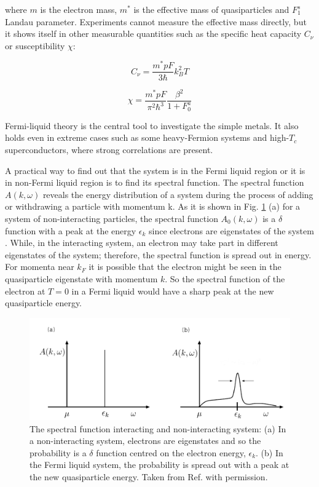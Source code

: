 \noindent where $m$ is the electron mass, $m^*$ is the effective mass of quasiparticles and $F_1 ^s$ Landau parameter. Experiments cannot measure the effective mass directly, but it shows itself in other measurable quantities such as the specific heat capacity $C_\nu$ or susceptibility $\chi$:

\begin{equation}
    C_\nu =\frac{m^* pF}{3\hbar} k_B ^2 T
\end{equation}


\begin{equation}
    \chi = \frac{m^*pF}{\pi ^2 \hbar^3} \frac{\beta ^2}{1+F_0 ^a}
\end{equation}

Fermi-liquid theory is the central tool to investigate the simple metals. It also holds even in extreme cases such as some heavy-Fermion systems and high-$T_{c}$ superconductors, where strong correlations are present.

A practical way to find out that the system is in the Fermi liquid region or it is in non-Fermi liquid region is to find its spectral function. The spectral function $A(k, \omega)$ reveals the energy distribution of a system during the process of adding or withdrawing a particle with momentum k. As it is shown in Fig. \ref{fig:flspectral} (a) for a system of non-interacting particles, the spectral function $A_0(k, \omega)$ is a $\delta$ function with a peak at the energy $\epsilon _k$ since electrons are eigenstates of the system \cite{Schofield, Saarloos}. While, in the interacting system, an electron may take part in different eigenstates of the system; therefore, the spectral function is spread out in energy. For momenta near $k_F$  it is possible that the electron might be seen in the quasiparticle eigenstate with momentum $k$. So the spectral function of the electron at $T = 0$  in a Fermi liquid would have a sharp peak at the new quasiparticle energy.

\begin{figure}[ht]
\centering
    \includegraphics[width=0.8\linewidth]{fig1/flspectral.pdf}
    
\caption{The spectral function interacting and non-interacting system: (a) In a non-interacting system, electrons are eigenstates and so the probability is a $\delta$ function centred on the electron energy,
$\epsilon _k$. (b) In the Fermi liquid system, the probability is spread out with a peak at the new quasiparticle energy. Taken from Ref. \cite{Saarloos} with permission. \label{fig:flspectral}}
\end{figure} 



